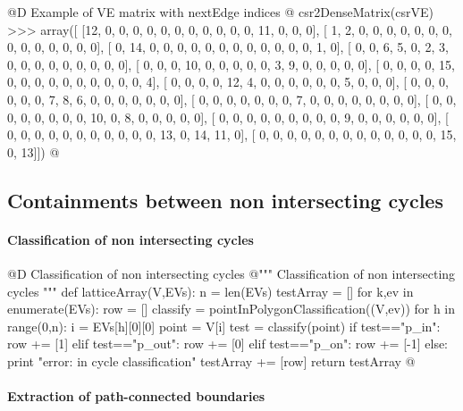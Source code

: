 \documentclass[11pt,oneside]{article}    %
\begin{document}
@D Example of VE matrix with nextEdge indices @{
csr2DenseMatrix(csrVE)
>>> array([
    [12,  0,  0,  0,  0,  0,  0,  0,  0,  0,  0,  0, 11,  0,  0,  0], 
    [ 1,  2,  0,  0,  0,  0,  0,  0,  0,  0,  0,  0,  0,  0,  0,  0], 
    [ 0, 14,  0,  0,  0,  0,  0,  0,  0,  0,  0,  0,  0,  0,  1,  0], 
    [ 0,  0,  6,  5,  0,  2,  3,  0,  0,  0,  0,  0,  0,  0,  0,  0], 
    [ 0,  0,  0, 10,  0,  0,  0,  0,  0,  3,  9,  0,  0,  0,  0,  0], 
    [ 0,  0,  0,  0, 15,  0,  0,  0,  0,  0,  0,  0,  0,  0,  0,  4], 
    [ 0,  0,  0,  0, 12,  4,  0,  0,  0,  0,  0,  0,  5,  0,  0,  0], 
    [ 0,  0,  0,  0,  0,  0,  7,  8,  6,  0,  0,  0,  0,  0,  0,  0], 
    [ 0,  0,  0,  0,  0,  0,  0,  7,  0,  0,  0,  0,  0,  0,  0,  0], 
    [ 0,  0,  0,  0,  0,  0,  0,  0, 10,  0,  8,  0,  0,  0,  0,  0], 
    [ 0,  0,  0,  0,  0,  0,  0,  0,  0,  9,  0,  0,  0,  0,  0,  0], 
    [ 0,  0,  0,  0,  0,  0,  0,  0,  0,  0,  0, 13,  0, 14, 11,  0], 
    [ 0,  0,  0,  0,  0,  0,  0,  0,  0,  0,  0,  0,  0, 15,  0, 13]])
@}

\subsection{Containments between non intersecting cycles}

\paragraph{Classification of non intersecting cycles}

@D Classification of non intersecting cycles
@{""" Classification of non intersecting cycles """
def latticeArray(V,EVs):
    n = len(EVs)
    testArray = []
    for k,ev in enumerate(EVs):
        row = []
        classify = pointInPolygonClassification((V,ev))
        for h in range(0,n):
            i = EVs[h][0][0]
            point = V[i]
            test = classify(point)
            if test=="p_in": row += [1]
            elif test=="p_out": row += [0]
            elif test=="p_on": row += [-1]
            else: print "error: in cycle classification"
        testArray += [row]
    return testArray
@}

\paragraph{Extraction of path-connected boundaries}
\end{document}
